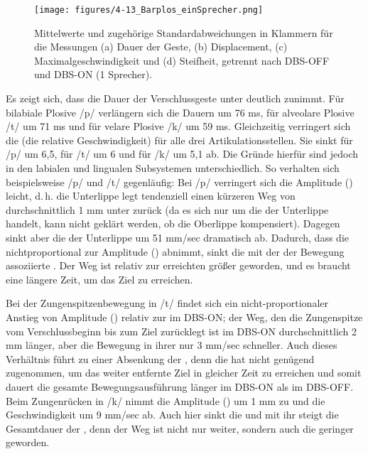 \begin{figure}
	\texttt{[image: figures/4-13\_Barplos\_einSprecher.png]}
	\caption{Mittelwerte und zugehörige Standardabweichungen in Klammern für die Messungen (a) Dauer der Geste, (b) Displacement, (c) Maximalgeschwindigkeit und (d) Steifheit, getrennt nach DBS-OFF und DBS-ON (1 Sprecher).}
	\label{figure:0414}
\end{figure}

Es zeigt sich, dass die Dauer der Verschlussgeste unter  deutlich zunimmt. Für bilabiale Plosive /p/ verlängern sich die Dauern um 76 ms, für alveolare Plosive /t/ um 71 ms und für velare Plosive /k/ um 59 ms. Gleichzeitig verringert sich die  (die relative Geschwindigkeit) für alle drei Artikulationsstellen. Sie sinkt für /p/ um 6,5, für /t/ um 6 und für /k/ um 5,1 ab. Die Gründe hierfür sind jedoch in den labialen und lingualen Subsystemen unterschiedlich. So verhalten sich beispielsweise /p/ und /t/ gegenläufig: Bei /p/ verringert sich die Amplitude () leicht, d.\,h. die Unterlippe legt tendenziell einen kürzeren Weg von durchschnittlich 1 mm unter  zurück (da es sich nur um die  der Unterlippe handelt, kann nicht geklärt werden, ob die Oberlippe kompensiert). Dagegen sinkt aber die  der Unterlippe um 51 mm/sec dramatisch ab. Dadurch, dass die  nichtproportional zur Amplitude () abnimmt, sinkt die mit der  der Bewegung assoziierte . Der Weg ist relativ zur erreichten  größer geworden, und es braucht eine längere Zeit, um das Ziel zu erreichen. 

Bei der Zungenspitzenbewegung in /t/ findet sich ein nicht-proportionaler Anstieg von Amplitude () relativ zur  im DBS-ON; der Weg, den die Zungenspitze vom Verschlussbeginn bis zum Ziel zurücklegt ist im DBS-ON durchschnittlich 2 mm länger, aber die Bewegung in ihrer  nur 3 mm/sec schneller. Auch dieses Verhältnis führt zu einer Absenkung der , denn die  hat nicht genügend zugenommen, um das weiter entfernte Ziel in gleicher Zeit zu erreichen und somit dauert die gesamte Bewegungsausführung länger im DBS-ON als im DBS-OFF. Beim Zungenrücken in /k/ nimmt die Amplitude () um 1 mm zu und die Geschwindigkeit um 9 mm/sec ab. Auch hier sinkt die  und mit ihr steigt die Gesamtdauer der , denn der Weg ist nicht nur weiter, sondern auch die  geringer geworden. 

